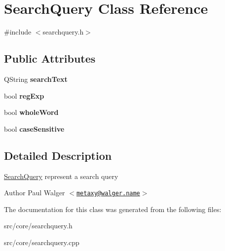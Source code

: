 \hypertarget{classSearchQuery}{
\section{SearchQuery Class Reference}
\label{classSearchQuery}
}


{\ttfamily \#include $<$searchquery.h$>$}

\subsection*{Public Attributes}
\begin{DoxyCompactItemize}
\item 
\hypertarget{classSearchQuery_ac1a81a6b032b5f72718324343174ae04}{
QString {\bfseries searchText}}
\label{classSearchQuery_ac1a81a6b032b5f72718324343174ae04}

\item 
\hypertarget{classSearchQuery_a635a08b8d0451a89a4340b14b0d3e832}{
bool {\bfseries regExp}}
\label{classSearchQuery_a635a08b8d0451a89a4340b14b0d3e832}

\item 
\hypertarget{classSearchQuery_a0fa67e4d661aab663f5123ea61a045c7}{
bool {\bfseries wholeWord}}
\label{classSearchQuery_a0fa67e4d661aab663f5123ea61a045c7}

\item 
\hypertarget{classSearchQuery_a2b744cf7f53cf61650156d4df675ccbe}{
bool {\bfseries caseSensitive}}
\label{classSearchQuery_a2b744cf7f53cf61650156d4df675ccbe}

\end{DoxyCompactItemize}


\subsection{Detailed Description}
\hyperlink{classSearchQuery}{SearchQuery} represent a search query

\begin{DoxyAuthor}{Author}
Paul Walger $<$\href{mailto:metaxy@walger.name}{\tt metaxy@walger.name}$>$ 
\end{DoxyAuthor}


The documentation for this class was generated from the following files:\begin{DoxyCompactItemize}
\item 
src/core/searchquery.h\item 
src/core/searchquery.cpp\end{DoxyCompactItemize}
